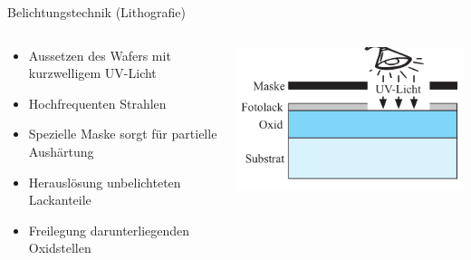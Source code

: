 \documentclass[12pt%
,aspectratio=169%
]{beamer}
\begin{document}
\begin{frame}{Belichtungstechnik (Lithograﬁe)}
\begin{columns}[T] %
\begin{column}{.58\textwidth}
\begin{itemize}
	\item Aussetzen des Wafers mit kurzwelligem UV-Licht
	\item Hochfrequenten Strahlen
	\item Spezielle Maske sorgt für partielle Aushärtung
	\item Herauslösung unbelichteten Lackanteile
	\item Freilegung darunterliegenden Oxidstellen
\end{itemize}
\end{column}%
\hfill%
\begin{column}{.38\textwidth}
\centering
\vspace*{-1cm}
\includegraphics[scale=0.45]{pictures/belichtung}
\end{column}%
\end{columns}
\end{frame}
\end{document}
